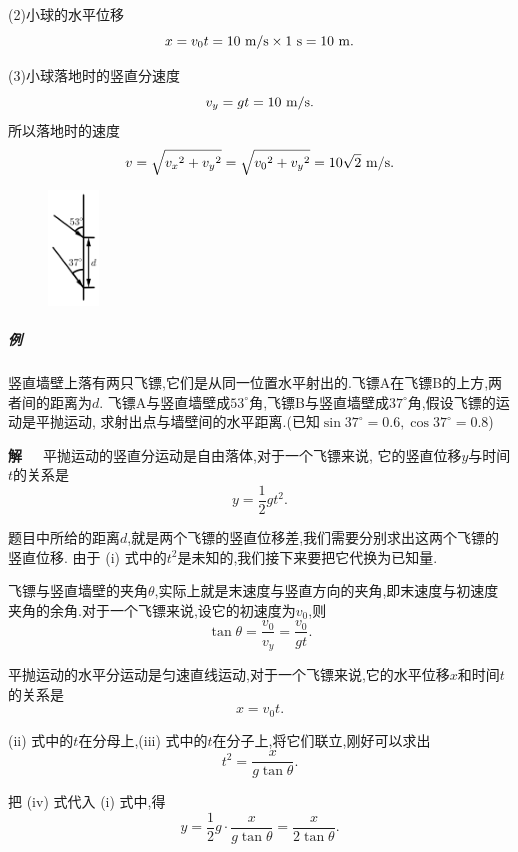 \documentclass[11pt,a4paper]{ctexart}
\newcounter{exam}[section]
\begin{document}
(2)小球的水平位移 $$x=v_0t=10\ \rm{m/s}\times1\ \rm{s}=10\ \rm{m}.$$

(3)小球落地时的竖直分速度 $$v_y=gt=10\ \rm{m/s}.$$
所以落地时的速度 $$v=\sqrt{{v_x}^2+{v_y}^2}=\sqrt{{v_0}^2+{v_y}^2}=10\sqrt2\ \rm{m/s}.$$

\begin{figure}
	\flushright
	\includegraphics[width=0.12\textwidth]{pic/pic4.png}
	\label{fig4}
\end{figure}

\subparagraph{例\theexam}
竖直墙壁上落有两只飞镖,它们是从同一位置水平射出的.飞镖A在飞镖B的上方,两者间的距离为$d$.
飞镖A与竖直墙壁成$53^{\circ}$角,飞镖B与竖直墙壁成$37^{\circ}$角,假设飞镖的运动是平抛运动,
求射出点与墙壁间的水平距离.(已知$\sin 37^{\circ}=0.6,\cos 37^{\circ}=0.8$)

\textbf{解}\ \ \ 平抛运动的竖直分运动是自由落体,对于一个飞镖来说,
它的竖直位移$y$与时间$t$的关系是
\begin{equation*}
	y=\frac12gt^2.
	\tag{i}
\end{equation*}

题目中所给的距离$d$,就是两个飞镖的竖直位移差,我们需要分别求出这两个飞镖的竖直位移.
由于 (i) 式中的$t^2$是未知的,我们接下来要把它代换为已知量.

飞镖与竖直墙壁的夹角$\theta$,实际上就是末速度与竖直方向的夹角,即末速度与初速度
夹角的余角.对于一个飞镖来说,设它的初速度为$v_0$,则
\begin{equation*}
	\tan \theta=\frac{v_0}{v_y}=\frac{v_0}{gt}.
	\tag{ii}
\end{equation*}

平抛运动的水平分运动是匀速直线运动,对于一个飞镖来说,它的水平位移$x$和时间$t$的关系是
\begin{equation*}
	x=v_0t.
	\tag{iii}
\end{equation*}

(ii) 式中的$t$在分母上,(iii) 式中的$t$在分子上,将它们联立,刚好可以求出
\begin{equation*}
	t^2=\frac{x}{g\tan \theta}.
	\tag{iv}
\end{equation*}


把 (iv) 式代入 (i) 式中,得
\begin{equation*}
	y=\frac12 g\cdot \frac{x}{g\tan \theta}=\frac{x}{2\tan \theta}.
	\tag{v}
\end{equation*}
\end{document}
